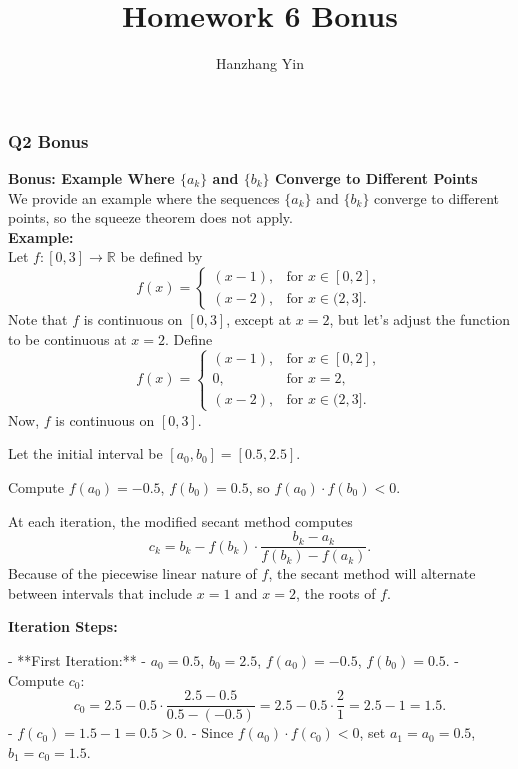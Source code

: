\documentclass{article}
\title{\vspace{-4em}Homework 6 Bonus}
\author{Hanzhang Yin}
\begin{document}
\maketitle

\subsubsection*{Q2 Bonus}

\textbf{Bonus: Example Where \( \{ a_k \} \) and \( \{ b_k \} \) Converge to Different Points}
\\
We provide an example where the sequences \( \{ a_k \} \) and \( \{ b_k \} \) converge to different points, so the squeeze theorem does not apply.
\\
\textbf{Example:}
\\
Let \( f: [0, 3] \to \mathbb{R} \) be defined by
\[
f(x) = \begin{cases}
(x - 1), & \text{for } x \in [0, 2], \\
(x - 2), & \text{for } x \in (2, 3].
\end{cases}
\]
Note that \( f \) is continuous on \( [0, 3] \), except at \( x = 2 \), but let's adjust the function to be continuous at \( x = 2 \). Define
\[
f(x) = \begin{cases}
(x - 1), & \text{for } x \in [0, 2], \\
0, & \text{for } x = 2, \\
(x - 2), & \text{for } x \in (2, 3].
\end{cases}
\]
Now, \( f \) is continuous on \( [0, 3] \).

Let the initial interval be \( [a_0, b_0] = [0.5, 2.5] \).

Compute \( f(a_0) = -0.5 \), \( f(b_0) = 0.5 \), so \( f(a_0) \cdot f(b_0) < 0 \).

At each iteration, the modified secant method computes
\[
c_k = b_k - f(b_k) \cdot \frac{b_k - a_k}{f(b_k) - f(a_k)}.
\]
Because of the piecewise linear nature of \( f \), the secant method will alternate between intervals that include \( x = 1 \) and \( x = 2 \), the roots of \( f \).

\textbf{Iteration Steps:}

- **First Iteration:**
  - \( a_0 = 0.5 \), \( b_0 = 2.5 \), \( f(a_0) = -0.5 \), \( f(b_0) = 0.5 \).
  - Compute \( c_0 \):
    \[
    c_0 = 2.5 - 0.5 \cdot \frac{2.5 - 0.5}{0.5 - (-0.5)} = 2.5 - 0.5 \cdot \frac{2}{1} = 2.5 - 1 = 1.5.
    \]
  - \( f(c_0) = 1.5 - 1 = 0.5 > 0 \).
  - Since \( f(a_0) \cdot f(c_0) < 0 \), set \( a_1 = a_0 = 0.5 \), \( b_1 = c_0 = 1.5 \).
\end{document}
